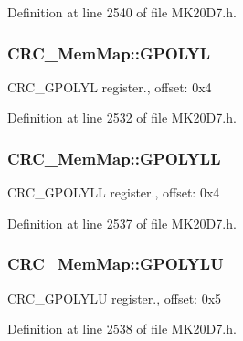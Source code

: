 Definition at line 2540 of file M\+K20\+D7.\+h.

\subsubsection[{\texorpdfstring{G\+P\+O\+L\+YL}{GPOLYL}}]{ C\+R\+C\+\_\+\+Mem\+Map\+::\+G\+P\+O\+L\+YL}\hypertarget{struct_c_r_c___mem_map_a4cd3b43b213defbaa07381a32b24af67}{}\label{struct_c_r_c___mem_map_a4cd3b43b213defbaa07381a32b24af67}
C\+R\+C\+\_\+\+G\+P\+O\+L\+YL register., offset\+: 0x4 

Definition at line 2532 of file M\+K20\+D7.\+h.

\subsubsection[{\texorpdfstring{G\+P\+O\+L\+Y\+LL}{GPOLYLL}}]{ C\+R\+C\+\_\+\+Mem\+Map\+::\+G\+P\+O\+L\+Y\+LL}\hypertarget{struct_c_r_c___mem_map_afefe4288aecf5a31ca6f6d64317eeb4b}{}\label{struct_c_r_c___mem_map_afefe4288aecf5a31ca6f6d64317eeb4b}
C\+R\+C\+\_\+\+G\+P\+O\+L\+Y\+LL register., offset\+: 0x4 

Definition at line 2537 of file M\+K20\+D7.\+h.

\subsubsection[{\texorpdfstring{G\+P\+O\+L\+Y\+LU}{GPOLYLU}}]{ C\+R\+C\+\_\+\+Mem\+Map\+::\+G\+P\+O\+L\+Y\+LU}\hypertarget{struct_c_r_c___mem_map_a0ba8bc9ddb8de4ca001f205f32cdd626}{}\label{struct_c_r_c___mem_map_a0ba8bc9ddb8de4ca001f205f32cdd626}
C\+R\+C\+\_\+\+G\+P\+O\+L\+Y\+LU register., offset\+: 0x5 

Definition at line 2538 of file M\+K20\+D7.\+h.

